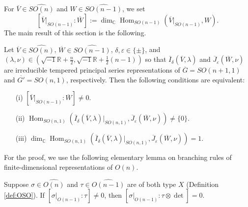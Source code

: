 For $\overline V \in \widehat{SO(n)}$
 and $W \in \widehat{SO(n-1)}$, 
 we set
\[
[\overline V|_{SO(n-1)}:\overline W]
:=\dim_{\mathbb{C}} {\operatorname{Hom}}_{SO(n-1)}(\overline V|_{SO(n-1)},W).  
\]
The main result of this section
 is the following.  
\begin{theorem}
\label{thm:tempSO}
Let $\overline V \in \widehat {SO(n)}$, 
 $\overline W \in \widehat {SO(n-1)}$, 
 $\delta, \varepsilon \in \{\pm\}$, 
 and $(\lambda,\nu) \in (\sqrt{-1}{\mathbb{R}}+ \frac n 2, 
 \sqrt{-1}{\mathbb{R}}+\frac 1 2(n-1))$
 so that $\overline {I}_{\delta}(\overline V, \lambda)$
 and $\overline {J}_{\varepsilon}(\overline W, \nu)$ are 
 irreducible tempered principal series representations
 of $\overline G=SO(n+1,1)$ and $\overline {G'}=SO(n,1)$, 
 respectively.  
Then the following conditions are equivalent:
\begin{enumerate}
\item[{\rm{(i)}}]
$[\overline V|_{SO(n-1)}: \overline W] 
\ne 0$.  

\item[{\rm{(ii)}}]
$\operatorname{Hom}_{SO(n,1)}
 (\overline {I}_{\delta}(\overline V, \lambda)|_{SO(n,1)}, 
  \overline {J}_{\varepsilon}(\overline W, \nu)) 
\ne \{0\}.$

\item[{\rm{(iii)}}]
$\dim_{\mathbb{C}}\operatorname{Hom}_{SO(n,1)}
 (\overline {I}_{\delta}(\overline V, \lambda)|_{SO(n,1)}, 
  \overline {J}_{\varepsilon}(\overline W, \nu)) =1.$  
\end{enumerate}
\end{theorem}
For the proof, 
we use the following elementary lemma
 on branching rules of finite-dimensional representations of $O(n)$.  
\begin{lemma}
\label{lem:Xbranch}
Suppose $\sigma \in \widehat{O(n)}$ and $\tau \in \widehat{O(n-1)}$
 are of both type $X$
 (Definition \ref{def:OSO}).  
If $[\sigma|_{O(n-1)}:\tau]\ne0$, 
 then $[\sigma|_{O(n-1)}:\tau \otimes \det]=0$.  
\end{lemma}

